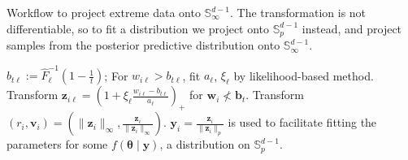 %     
\begin{algorithm}[tb]
    \caption{Workflow to project extreme data onto $\mathbb{S}_{\infty}^{d-1}$.
        The transformation is not differentiable, so to fit a distribution
        we project onto $\mathbb{S}_p^{d-1}$ instead, and project samples from
        the posterior predictive distribution onto $\mathbb{S}_{\infty}^{d-1}$.
        \label{alg:workflow}}
    \begin{algorithmic}[1]
        \State $b_{t\ell} := \hat{F}_{\ell}^{-1}\left(1 - \frac{1}{t}\right)$; 
            For $w_{i\ell} > b_{t\ell}$, fit $a_{\ell}$, $\xi_{\ell}$ 
            by likelihood-based method.
        \State Transform 
            $\bm{z}_{i\ell} = \left(1 + \xi_{\ell}\frac{w_{i\ell} 
                - b_{t\ell}}{a_{\ell}}\right)_+$ for $\bm{w}_i\not< \bm{b}_t$.
        \State Transform $(r_i,\bm{v}_i) = \left(\lVert \bm{z}_i\rVert_\infty, 
            \frac{\bm{z}_i}{\lVert \bm{z}_i\rVert_{\infty}}\right)$.
        \State $\bm{y}_i = \frac{\bm{z}_i}{\lVert \bm{z}_i\rVert_p}$ is used to 
            facilitate fitting the parameters for some $f(\bm{\theta}\mid\bm{y})$, 
            a distribution on $\mathbb{S}_p^{d-1}$.
    \end{algorithmic}
\end{algorithm}

